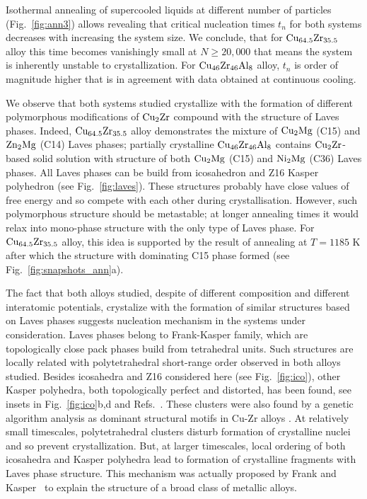 \documentclass[jcp,twocolumn,superscriptaddress,floatfix,graphicx,showpacs]{revtex4-1}
\begin{document}
Isothermal annealing of supercooled liquids at different number of particles (Fig.~\ref{fig:ann3}) allows revealing that critical nucleation times $t_n$ for both systems  decreases with increasing the system size. We conclude, that for ${\rm Cu_{64.5}Zr_{35.5}}$ alloy this time becomes  vanishingly small at $N\geq 20,000$ that means the system is inherently unstable to crystallization. For ${\rm Cu_{46}Zr_{46}Al_{8}}$ alloy, $t_n$ is order of magnitude higher that is in agreement with data obtained at continuous cooling.

We observe that both systems studied crystallize with the formation of different polymorphous modifications of ${\rm Cu_2Zr}$ compound with the structure of Laves phases. Indeed,  ${\rm Cu_{64.5}Zr_{35.5}}$  alloy demonstrates the mixture of ${\rm Cu_2Mg}$ (C15) and ${\rm Zn_2Mg}$ (C14) Laves phases; partially crystalline ${\rm Cu_{46}Zr_{46}Al_{8}}$ contains ${\rm Cu_2Zr}$-based solid solution with structure of both  ${\rm Cu_2Mg}$ (C15) and ${\rm Ni_2Mg}$ (C36) Laves phases. All Laves phases can be build from icosahedron and Z16 Kasper polyhedron (see Fig.~\ref{fig:laves}). These structures probably have close values of free energy and so compete with each other during crystallisation.  However, such polymorphous structure should be metastable; at longer annealing times it would relax into mono-phase structure with the only type of Laves phase. For ${\rm Cu_{64.5}Zr_{35.5}}$  alloy, this idea is supported by the result of annealing at $T=1185$ K after which the structure with dominating C15 phase formed (see Fig.~\ref{fig:snapshots_ann}a).

The fact that both alloys studied, despite of different composition and different interatomic potentials, crystalize with the formation of similar structures based on Laves phases suggests nucleation mechanism in the systems under consideration. Laves phases belong to Frank-Kasper family, which are topologically close pack phases build from tetrahedral units. Such structures are locally related with polytetrahedral short-range order observed in both alloys studied. Besides icosahedra and Z16 considered here (see Fig.~\ref{fig:ico}), other  Kasper polyhedra, both topologically perfect and distorted, has been found, see insets in Fig.~\ref{fig:ico}b,d and Refs.~\cite{Li2009PRB,Peng2010ApplPhysLett,Wu2013PRB,Wang2015JPhysChemA,Cheng2009PRL}. These clusters were also found by a genetic algorithm analysis as dominant structural motifs in Cu-Zr alloys \cite{Sun2016SciRep}. At relatively small timescales, polytetrahedral clusters disturb formation of crystalline nuclei and so prevent crystallization. But, at larger timescales, local ordering of both icosahedra and Kasper polyhedra lead to formation of crystalline fragments with Laves phase structure. This mechanism was actually proposed by Frank and Kasper~\cite{Frank1958ActCryst,Frank1959ActCryst} to explain the structure of a broad class of metallic alloys.
\end{document}
